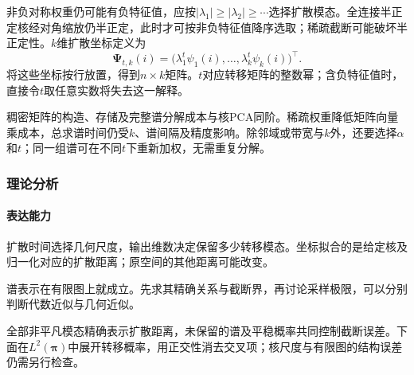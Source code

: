 非负对称权重仍可能有负特征值，应按$|\lambda_1|\geq|\lambda_2|\geq\cdots$选择扩散模态。全连接半正定核经对角缩放仍半正定，此时才可按非负特征值降序选取；稀疏截断可能破坏半正定性。$k$维扩散坐标定义为
\begin{equation}
  \label{eq:dim-diffusion-map}
  \bm{\Psi}_{t,k}(i)
  =\bigl(\lambda_1^t\psi_1(i),\ldots,
         \lambda_k^t\psi_k(i)\bigr)^{\top}.
\end{equation}
将这些坐标按行放置，得到$n\times k$矩阵。$t$对应转移矩阵的整数幂；含负特征值时，直接令$t$取任意实数将失去这一解释。

稠密矩阵的构造、存储及完整谱分解成本与核PCA同阶。稀疏权重降低矩阵向量乘成本，总求谱时间仍受$k$、谱间隔及精度影响。除邻域或带宽与$k$外，还要选择$\alpha$和$t$；同一组谱可在不同$t$下重新加权，无需重复分解。

\subsubsection{理论分析}
\label{sec:dim-diffusion-theory}

\paragraph{表达能力}
扩散时间选择几何尺度，输出维数决定保留多少转移模态。坐标拟合的是给定核及归一化对应的扩散距离；原空间的其他距离可能改变。

谱表示在有限图上就成立。先求其精确关系与截断界，再讨论采样极限，可以分别判断代数近似与几何近似。

全部非平凡模态精确表示扩散距离，未保留的谱及平稳概率共同控制截断误差。下面在$L^2(\bm{\pi})$中展开转移概率，用正交性消去交叉项；核尺度与有限图的结构误差仍需另行检查。

